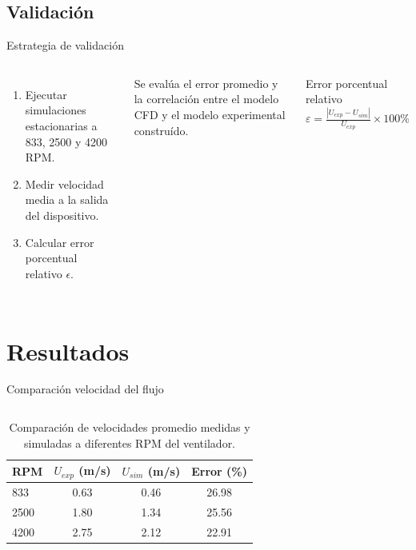 \subsection{Validación}
\begin{frame}{Estrategia de validación}
\begin{columns}
\begin{enumerate}
  \item Ejecutar simulaciones estacionarias a 833, 2500 y 4200 RPM.
  \item Medir velocidad media a la salida del dispositivo.
  \item Calcular error porcentual relativo $\epsilon$.
\end{enumerate}
\vspace{0.3cm}
Se evalúa el error promedio y la correlación entre el modelo CFD y el modelo experimental construído.
\begin{block}{Error porcentual relativo}
    \(\varepsilon = \frac{|U_{exp}-U_{sim}|}{U_{exp}}\times100\%\)
\end{block}
\end{columns}
\end{frame}

\section{Resultados}
\begin{frame}{Comparación velocidad del flujo}
\begin{columns}
\begin{table}
\begin{block}
\centering
\begin{tabular}{@{}lccc@{}}
  \toprule
  \textbf{RPM} & \textbf{$U_{exp}$ (m/s)} & \textbf{$U_{sim}$ (m/s)} & \textbf{Error (\%)} \\
  \midrule
  833  & 0.63 & 0.46 & 26.98 \\
  2500 & 1.80 & 1.34 & 25.56 \\
  4200 & 2.75 & 2.12 & 22.91 \\
  \bottomrule
\end{tabular}
  \caption{Comparación de velocidades promedio medidas y simuladas a diferentes RPM del ventilador.}
\end{block}
  \end{table}
\end{columns}
\end{frame}

